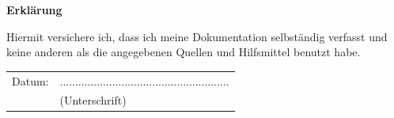 \documentclass[12pt,a4paper,bibliography=totocnumbered,listof=totocnumbered]{scrartcl}
\begin{document}
\newpage
\thispagestyle{empty}
\begin{center}
	\vspace*{5em}
	\huge\textbf{Erklärung}\\
\end{center}
\vspace{2em}
Hiermit versichere ich, dass ich meine Dokumentation selbständig verfasst und keine anderen als die angegebenen Quellen und Hilfsmittel benutzt habe.

\vspace{4em}
\begin{minipage}{\linewidth}
	\begin{tabular}{p{15em}p{15em}}
		Datum: &  .......................................................\\
		& \centering (Unterschrift)\\
	\end{tabular}
\end{minipage}
\end{document}
